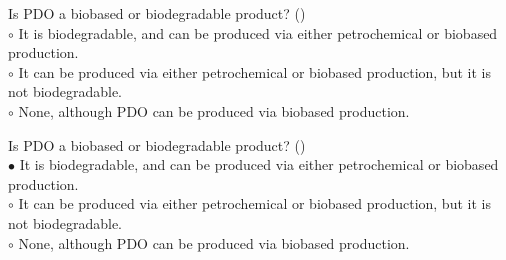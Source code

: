 \documentclass[]{beamer}
\begin{document}
\begin{CJK}{UTF8}{gbsn}
\begin{frame}[shrink] {}
\addtocounter{questions}{1}
\color{blue}
Is PDO a biobased or biodegradable product?
({})\\
\color{black}
\setlength{\parindent}{-0.4cm}
{\color{red}$\circ$}  It is biodegradable, and can be produced via either petrochemical or biobased production.  \\
{\color{red}$\circ$} It can be produced via either petrochemical or biobased production, but it is not biodegradable.   \\
{\color{red}$\circ$} None, although PDO can be produced via biobased production.  \\
\end{frame}
\begin{frame}[shrink] {}
\addtocounter{answers}{1}
\color{blue}
Is PDO a biobased or biodegradable product?
({})\\
\color{black}
\setlength{\parindent}{-0.4cm}
{\color{red}$\bullet$} It is biodegradable, and can be produced via either petrochemical or biobased production.  \\
{\color{red}$\circ$} It can be produced via either petrochemical or biobased production, but it is not biodegradable.   \\
{\color{red}$\circ$} None, although PDO can be produced via biobased production.  \\
\end{frame}



\end{CJK}
\end{document}
